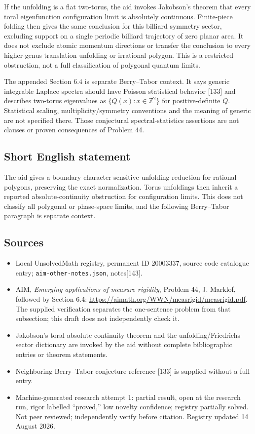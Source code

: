 \documentclass[11pt]{article}
\newcommand{\Z}{\mathbb{Z}}
\begin{document}
If the unfolding is a flat two-torus, the aid invokes Jakobson's theorem that every toral eigenfunction configuration limit is absolutely continuous. Finite-piece folding then gives the same conclusion for this billiard symmetry sector, excluding support on a single periodic billiard trajectory of zero planar area. It does not exclude atomic momentum directions or transfer the conclusion to every higher-genus translation unfolding or irrational polygon. This is a restricted obstruction, not a full classification of polygonal quantum limits.

The appended Section 6.4 is separate Berry--Tabor context. It says generic integrable Laplace spectra should have Poisson statistical behavior [133] and describes two-torus eigenvalues as $\{Q(x):x\in\Z^2\}$ for positive-definite $Q$. Statistical scaling, multiplicity/symmetry conventions and the meaning of generic are not specified there. Those conjectural spectral-statistics assertions are not clauses or proven consequences of Problem 44.
\subsection{Short English statement}
The aid gives a boundary-character-sensitive unfolding reduction for rational polygons, preserving the exact normalization. Torus unfoldings then inherit a reported absolute-continuity obstruction for configuration limits. This does not classify all polygonal or phase-space limits, and the following Berry–Tabor paragraph is separate context.
\subsection{Sources}
\begin{itemize}
\item Local UnsolvedMath registry, permanent ID 20003337, source code catalogue entry; \texttt{aim-other-notes.json}, notes[143].
\item AIM, \emph{Emerging applications of measure rigidity}, Problem 44, J. Marklof, followed by Section 6.4: \url{https://aimath.org/WWN/measrigid/measrigid.pdf}. The supplied verification separates the one-sentence problem from that subsection; this draft does not independently check it.
\item Jakobson's toral absolute-continuity theorem and the unfolding/Friedrichs-sector dictionary are invoked by the aid without complete bibliographic entries or theorem statements.
\item Neighboring Berry--Tabor conjecture reference [133] is supplied without a full entry.
\item Machine-generated research attempt 1: partial result, open at the research run, rigor labelled ``proved,'' low novelty confidence; registry partially solved. Not peer reviewed; independently verify before citation. Registry updated 14 August 2026.
\end{itemize}
\end{document}
